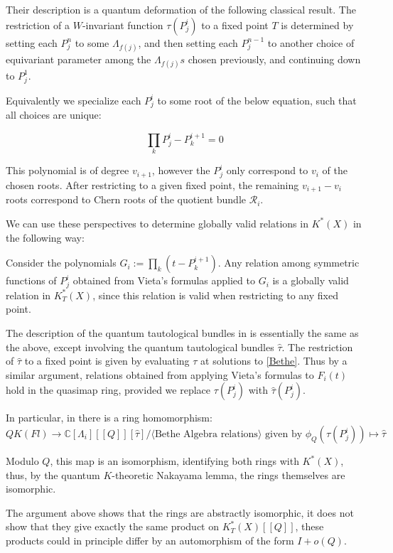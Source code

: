 \documentclass[11pt,letterpaper]{amsart}
\begin{document}
Their description is a quantum deformation of the following classical result. The restriction of a $W$-invariant function $\tau(P^i_j)$ to a fixed point $T$ is determined by setting each $P^n_j$ to some $\Lambda_{f(j)}$, and then setting each $P^{n-1}_j$ to another choice of equivariant parameter among the $\Lambda_{f(j)}s$ chosen previously, and continuing down to $P^1_j$. 

Equivalently we specialize each $P^i_j$ to some root of the below equation, such that all choices are unique:

\begin{equation}
    \label{classic}
    \prod_k P^i_j-P^{i+1}_k=0
\end{equation}

This polynomial is of degree $v_{i+1}$, however the $P^i_j$ only correspond to $v_{i}$ of the chosen roots. After restricting to a given fixed point, the remaining $v_{i+1}-v_i$ roots correspond to Chern roots of the quotient bundle $\mathcal{R}_i$.



We can use these perspectives to determine globally valid relations in $K^*(X)$ in the following way:


Consider the polynomials $G_i:=\prod_k(t-P^{i+1}_k)$. 
Any relation among symmetric functions of $P^i_j$ obtained from Vieta's formulas applied to $G_i$ is a globally valid relation in $K_T^*(X)$, since this relation is valid when restricting to any fixed point. 


The description of the quantum tautological bundles in \cite{manybody} is essentially the same as the above, except involving the quantum tautological bundles $\widehat{\tau}$. The restriction of $\widehat{\tau}$ to a fixed point is given by evaluating $\tau$ at solutions to \eqref{Bethe}. Thus by a similar argument, relations obtained from applying Vieta's formulas to $F_i(t)$ hold in the quasimap ring, provided we replace $\tau(P^i_j)$ with $\widehat{\tau}(P^i_j)$. 



In particular, in there is a ring homomorphism:
$$QK(Fl)\to \mathbb{C}[\Lambda_i][[Q]][\widehat{\tau}]/\langle \text{Bethe Algebra relations} \rangle\text{ given by } \phi_Q(\tau(P^i_j))\mapsto \widehat{\tau}$$

Modulo $Q$, this map is an isomorphism, identifying both rings with $K^*(X)$, thus, by the quantum $K$-theoretic Nakayama lemma, the rings themselves are isomorphic. 



\begin{remark}
    The argument above shows that the rings are abstractly isomorphic, it does not show that they give exactly the same product on $K_T^*(X)[[Q]]$, these products could in principle differ by an automorphism of the form $I+o(Q)$. 
\end{remark}



\clearpage




 

\end{document}
